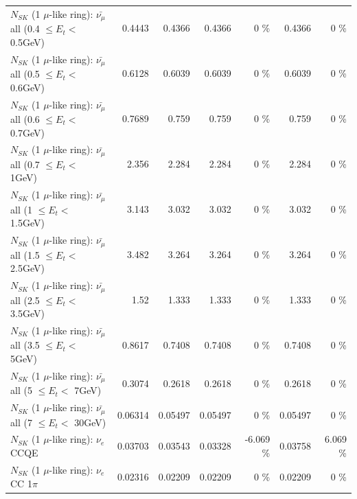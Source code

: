 \begin{table}
\begin{tabular}{| l | r | r | r  r | r  r |}
 $N_{SK}$ (1 $\mu$-like ring): $\bar{\nu_{\mu}}$ all (0.4 $\leq E_{t} <$ 0.5GeV) &          0.4443 &          0.4366 &          0.4366 &        0 \%  &          0.4366 &        0 \%  \\ 
 $N_{SK}$ (1 $\mu$-like ring): $\bar{\nu_{\mu}}$ all (0.5 $\leq E_{t} <$ 0.6GeV) &          0.6128 &          0.6039 &          0.6039 &        0 \%  &          0.6039 &        0 \%  \\ 
 $N_{SK}$ (1 $\mu$-like ring): $\bar{\nu_{\mu}}$ all (0.6 $\leq E_{t} <$ 0.7GeV) &          0.7689 &           0.759 &           0.759 &        0 \%  &           0.759 &        0 \%  \\ 
   $N_{SK}$ (1 $\mu$-like ring): $\bar{\nu_{\mu}}$ all (0.7 $\leq E_{t} <$ 1GeV) &           2.356 &           2.284 &           2.284 &        0 \%  &           2.284 &        0 \%  \\ 
   $N_{SK}$ (1 $\mu$-like ring): $\bar{\nu_{\mu}}$ all (1 $\leq E_{t} <$ 1.5GeV) &           3.143 &           3.032 &           3.032 &        0 \%  &           3.032 &        0 \%  \\ 
 $N_{SK}$ (1 $\mu$-like ring): $\bar{\nu_{\mu}}$ all (1.5 $\leq E_{t} <$ 2.5GeV) &           3.482 &           3.264 &           3.264 &        0 \%  &           3.264 &        0 \%  \\ 
 $N_{SK}$ (1 $\mu$-like ring): $\bar{\nu_{\mu}}$ all (2.5 $\leq E_{t} <$ 3.5GeV) &            1.52 &           1.333 &           1.333 &        0 \%  &           1.333 &        0 \%  \\ 
   $N_{SK}$ (1 $\mu$-like ring): $\bar{\nu_{\mu}}$ all (3.5 $\leq E_{t} <$ 5GeV) &          0.8617 &          0.7408 &          0.7408 &        0 \%  &          0.7408 &        0 \%  \\ 
     $N_{SK}$ (1 $\mu$-like ring): $\bar{\nu_{\mu}}$ all (5 $\leq E_{t} <$ 7GeV) &          0.3074 &          0.2618 &          0.2618 &        0 \%  &          0.2618 &        0 \%  \\ 
    $N_{SK}$ (1 $\mu$-like ring): $\bar{\nu_{\mu}}$ all (7 $\leq E_{t} <$ 30GeV) &         0.06314 &         0.05497 &         0.05497 &        0 \%  &         0.05497 &        0 \%  \\ 
\hline
\hline
\hline
                                      $N_{SK}$ (1 $\mu$-like ring): $\nu_e$ CCQE &         0.03703 &         0.03543 &         0.03328 &   -6.069 \%  &         0.03758 &    6.069 \%  \\ 
                                 $N_{SK}$ (1 $\mu$-like ring): $\nu_e$ CC 1$\pi$ &         0.02316 &         0.02209 &         0.02209 &        0 \%  &         0.02209 &        0 \%  \\ 

\end{tabular}
\end{table}
